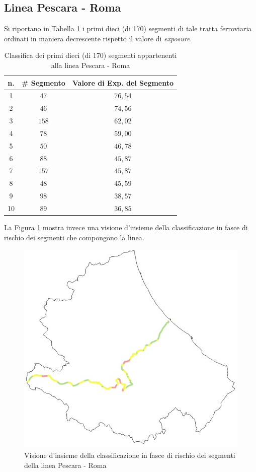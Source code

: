 \subsection{Linea Pescara - Roma}
Si riportano in Tabella \ref{classificapescararoma} i primi dieci (di 170) segmenti di tale tratta ferroviaria ordinati in maniera decrescente rispetto il valore di \textit{exposure}.
\begin{table}[h]
\centering
\begin{tabular}{|c|c|c|}
\hline
\rowcolor{lightgray}
n. & \# Segmento & Valore di Exp. del Segmento \\ \hline \rowcolor{flamingopink}
1  & $47$        & $76,54$                      \\ \hline \rowcolor{flamingopink}
2  & $46$        & $74,56$                      \\ \hline \rowcolor{flamingopink}
3  & $158$        & $62,02$                      \\ \hline \rowcolor{flamingopink}
4  & $78$        & $59,00$                      \\ \hline \rowcolor{flamingopink}
5  & $50$        & $46,78$                      \\ \hline \rowcolor{flamingopink}
6  & $88$        & $45,87$                      \\ \hline \rowcolor{flamingopink}
7  & $157$       & $45,87$                      \\ \hline \rowcolor{flamingopink}
8  & $48$        & $45,59$                      \\ \hline \rowcolor{flamingopink}
9  & $98$        & $38,57$                      \\ \hline \rowcolor{flamingopink}
10 & $89$        & $36,85$                      \\ \hline
\end{tabular}
\caption{Classifica dei primi dieci (di 170) segmenti appartenenti alla linea Pescara - Roma}
\label{classificapescararoma}
\end{table}
\newline
La Figura \ref{pescararoma} mostra invece una visione d'insieme della classificazione in fasce di rischio dei segmenti che compongono la linea.
\begin{figure}[h]
\centering
\includegraphics[width=0.4\linewidth]{img/romapescara.jpeg}
\caption{Visione d'insieme della classificazione in fasce di rischio dei segmenti della linea Pescara - Roma}
\label{pescararoma}
\end{figure}
